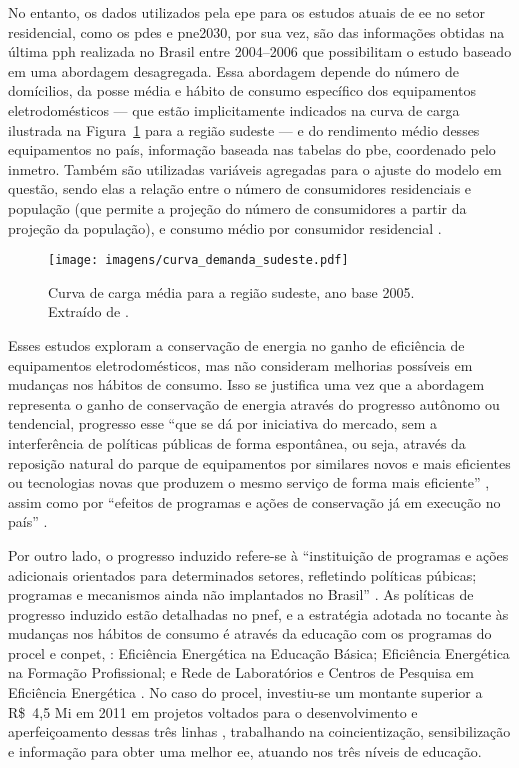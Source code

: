 No entanto, os dados utilizados pela \gls{epe} para os estudos atuais
de \gls{ee} no setor residencial, como os \glspl{pde} e \gls{pne2030},
por sua vez, são das informações obtidas na última \gls{pph} realizada
no Brasil entre 2004--2006 que possibilitam o estudo baseado em uma
abordagem desagregada. Essa abordagem depende do número de domícilios,
da posse média e hábito de consumo específico dos equipamentos
eletrodomésticos --- que estão implicitamente indicados na curva de
carga ilustrada na Figura~\ref{fig:curva_carga} para a região sudeste
--- e do rendimento médio desses equipamentos no país, informação
baseada nas tabelas do \gls{pbe}, coordenado pelo \gls{inmetro}.
Também são utilizadas variáveis agregadas para o ajuste do modelo em
questão, sendo elas a relação entre o número de consumidores
residenciais e população (que permite a projeção do número de
consumidores a partir da projeção da população), e consumo médio por
consumidor residencial
\cite{epe_eficiencia_2012,pde_2020,pne30_eff_energ}. 

\begin{figure}[h!t]
\centering
\texttt{[image: imagens/curva\_demanda\_sudeste.pdf]}
\caption[Curva de carga média para a região sudeste, ano base 2005.]{Curva de
carga média para a região sudeste, ano base 2005. Extraído de
\cite{result_procel_2005}.}
\label{fig:curva_carga}
\end{figure}

Esses estudos exploram a conservação de energia no ganho de eficiência 
de equipamentos eletrodomésticos, mas não consideram melhorias possíveis
em mudanças nos hábitos de consumo. Isso se justifica uma vez que a abordagem 
representa o ganho de conservação de energia através do progresso autônomo
ou tendencial, progresso esse ``que se dá por iniciativa do mercado, sem a
interferência de políticas públicas de forma espontânea, ou seja, através da
reposição natural do parque de equipamentos por similares novos e mais
eficientes ou tecnologias novas que produzem o mesmo serviço de forma mais
eficiente'' \cite[p.1]{pnef}, assim como por ``efeitos de programas e ações de
conservação já em execução no país'' \cite[p.247]{pde_2020}. 

Por outro lado, o progresso induzido refere-se à ``instituição de programas e ações
adicionais orientados para determinados setores, refletindo políticas púbicas;
programas e mecanismos ainda não implantados no Brasil'' \cite[p.247]{pde_2020}.
As políticas de progresso induzido estão detalhadas no \gls{pnef}, e a
estratégia adotada no tocante às mudanças nos hábitos de consumo é através da
educação com os programas do \gls{procel} e \gls{conpet}, : Eficiência Energética na Educação Básica; Eficiência 
Energética na Formação Profissional; e Rede de Laboratórios e Centros de Pesquisa em Eficiência
Energética \cite[cap. 5]{pnef}. No caso do \gls{procel}, investiu-se um montante superior a
R\$~4,5 Mi em 2011 em projetos voltados para o desenvolvimento e
aperfeiçoamento dessas três linhas \cite{procel_resultados_2012}, trabalhando na
coincientização, sensibilização e informação para obter uma melhor \gls{ee},
atuando nos três níveis de educação.


